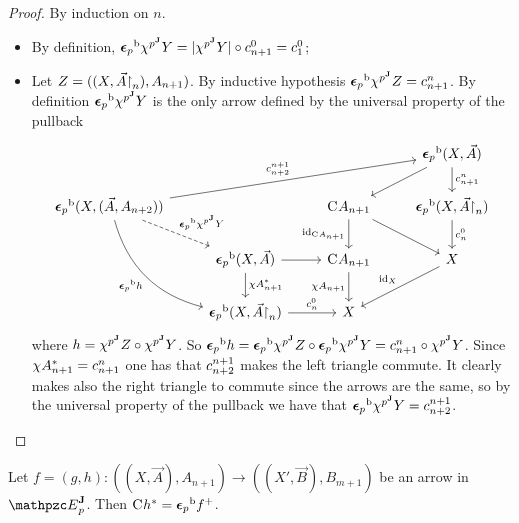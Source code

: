 \documentclass{lmcs} %
\theoremstyle{plain}\newtheorem{satz}[thm]{Satz} %
\begin{document}
\begin{proof}
	By induction on $n$.
	\begin{itemize}[align=left]
		\item[\emph{n=0:}] By definition, ${\boldsymbol{\epsilon}_p}^{\mathrm{b}}\chi^{{p}^{\mathbf{J}}} Y= |\chi^{{p}^{\mathbf{J}}} Y|\circ c^{0}_{n+1}=c^{0}_{1}$;
		\item[\emph{n+1:}] Let $Z=((X,\vec{A}\mathord{\restriction} _n), A_{n+1})$. By inductive hypothesis ${\boldsymbol{\epsilon}_p}^{\mathrm{b}}\chi^{{p}^{\mathbf{J}}} Z=c^{n}_{n+1}$. 
		By definition ${\boldsymbol{\epsilon}_p}^{\mathrm{b}}\chi^{{p}^{\mathbf{J}}} Y$ is the only arrow defined by the universal property of the pullback
		\[\begin{tikzcd}
			&& {} & {\fb{\twont{\epsilon}_p}(X,\vec{A})} \\
			{\fb{\twont{\epsilon}_p}(X,(\vec{A}, A_{n+2}))} && {\comp{} A_{n+1}} & {\fb{\twont{\epsilon}_p}(X,\vec{A}\rstn_n)} \\
			& {\fb{\twont{\epsilon}_p}(X,\vec{A})} & {\comp{} A_{n+1}} & X \\
			& {\fb{\twont{\epsilon}_p}(X,\vec{A}\rstn_n)} & {X}
			\arrow[from=1-4, to=2-3]
			\arrow["{\C{n}{n+1}}", from=1-4, to=2-4]
			\arrow["{\C{n+1}{n+2}}", from=2-1, to=1-4]
			\arrow["\fb{\twont{\epsilon}_p}\JFC{p} Y", dashed, from=2-1, to=3-2]
			\arrow["\fb{\twont{\epsilon}_p}h"', bend right, from=2-1, to=4-2]
			\arrow["{\id{\comp{} A_{n+1}}}"', from=2-3, to=3-3]
			\arrow[from=2-3, to=3-4]
			\arrow["{\C{0}{n}}", from=2-4, to=3-4]
			\arrow[from=3-2, to=3-3]
			\arrow["\chi A_{n+1}^*", from=3-2, to=4-2]
			\arrow["{\chi A_{n+1}}"', from=3-3, to=4-3]
			\arrow["{\id{X}}"', from=3-4, to=4-3]
			\arrow["{\C{0}{n}}", from=4-2, to=4-3]
		\end{tikzcd}\]
		where $h=\chi^{{p}^{\mathbf{J}}} Z\circ\chi^{{p}^{\mathbf{J}}} Y$.
		So ${\boldsymbol{\epsilon}_p}^{\mathrm{b}}h={\boldsymbol{\epsilon}_p}^{\mathrm{b}}\chi^{{p}^{\mathbf{J}}} Z\circ {\boldsymbol{\epsilon}_p}^{\mathrm{b}}\chi^{{p}^{\mathbf{J}}} Y=c^{n}_{n+1}\circ\chi^{{p}^{\mathbf{J}}} Y$. Since $\chi A_{n+1}^*=c^{n}_{n+1}$ one has that $c^{n+1}_{n+2}$ makes the left triangle commute. It clearly makes also the right triangle to commute since the arrows are the same, so by the universal property of the pullback we have that ${\boldsymbol{\epsilon}_p}^{\mathrm{b}}\chi^{{p}^{\mathbf{J}}} Y=c^{n+1}_{n+2}$.
	\end{itemize}
\end{proof}


\begin{lem}\label{lem:jcoun2}
	Let $f = (g,h):((X,\vec{A}), A_{n+1})\rightarrow ((X',\vec{B}), B_{m+1})$ be an arrow in $\JDomE{p}$. Then $\mathrm{C}^{} h^* = {\boldsymbol{\epsilon}_p}^{\mathrm{b}}f^+$.
\end{lem}
\end{document}
